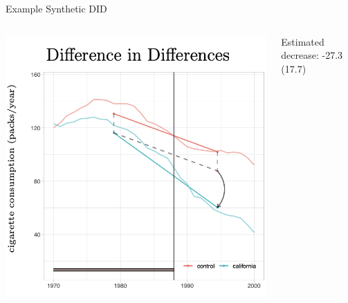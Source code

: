 \documentclass[t]{beamer}
\begin{document}
\begin{frame}{Example Synthetic DID}
  \begin{columns}[T]
    \begin{column}{.65\textwidth}
      \includegraphics[width=\textwidth]{lecture_includes/sdid_2.png}
    \end{column}
    \hfill
    \begin{column}{.3\textwidth}
      Estimated decrease: -27.3 (17.7)
    \end{column}
  \end{columns}
\end{frame}
\end{document}
